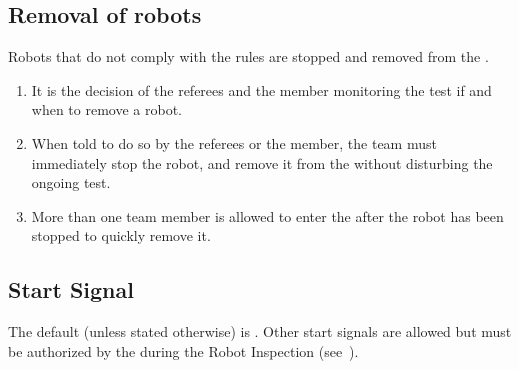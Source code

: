 \subsection{Removal of robots}\label{rule:robot_removal}

Robots that do not comply with the rules are stopped and removed from the \Arena{}.

\begin{enumerate}
	\item It is the decision of the referees and the \TC{} member monitoring the test if and when to remove a robot.

	\item When told to do so by the referees or the \TC{} member, the team must immediately stop the robot, and remove it from the \Arena{} without disturbing the ongoing test.
	
	\item More than one team member is allowed to enter the \Arena{} after the robot has been stopped to quickly remove it.

\end{enumerate}


\subsection{Start Signal}\label{rule:start_signal}
The default  (unless stated otherwise) is .
Other start signals are allowed but must be authorized by the \TC{} during the Robot Inspection (see~).

